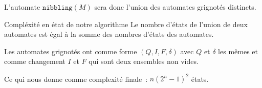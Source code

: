 \begin{frame}{\myframetitle}
  \begin{definition}
    L'automate \(\texttt{nibbling}(M)\) sera donc l'union des automates
    grignotés distincts.
  \end{definition}

  \pause[]

  \begin{block}{Compléxité en état de notre algorithme}
    Le nombre d'états de l'union de deux automates est égal à la somme des
    nombres d'états des automates.

    \pause[]

    \vphantom{}

    Les automates grignotés ont comme forme \((Q, I, F, \delta)\) avec \(Q\)
    et \(\delta\) les mêmes et comme changement \(I\) et \(F\) qui sont deux
    ensembles non vides.

    \pause[]

    \vphantom{}

    Ce qui nous donne comme complexité finale~: \(n(2^n - 1)^2\) états.
  \end{block}
\end{frame}

